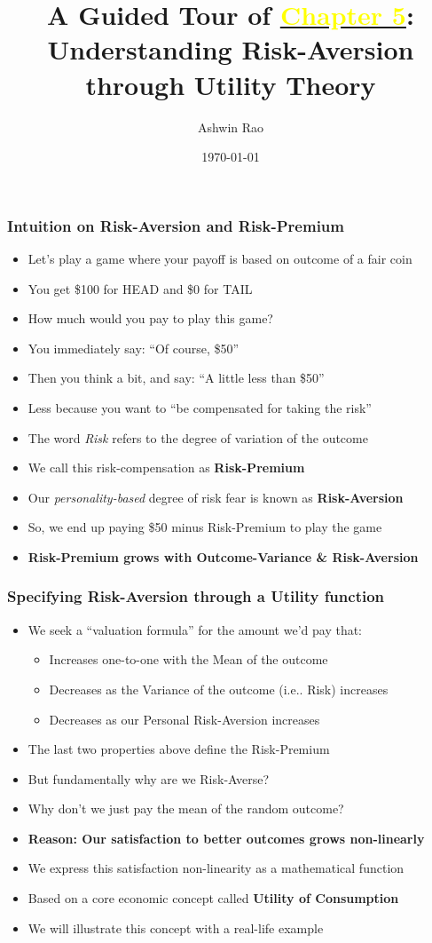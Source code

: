\documentclass[handout]{beamer}
\title[Utility Theory Chapter]{A Guided Tour of \href{http://stanford.edu/~ashlearn/RLForFinanceBook/book.pdf}{\underline{\textcolor{yellow}{Chapter 5}}}: \\  Understanding Risk-Aversion through Utility Theory}
\author{Ashwin Rao} %
\institute[Stanford] %
{
ICME, Stanford University
}
\date{\today} %
\begin{document}
\begin{frame}
\titlepage %
\end{frame}

\begin{frame}
\frametitle{Intuition on Risk-Aversion and Risk-Premium}
\pause
\begin{itemize}[<+->]
\item Let's play a game where your payoff is based on outcome of a fair coin
\item You get \$100 for HEAD and \$0 for TAIL
\item How much would you pay to play this game?
\item You immediately say: ``Of course, \$50''
\item Then you think a bit, and say: ``A little less than \$50''
\item Less because you want to ``be compensated for taking the risk''
\item The word {\em Risk} refers to the degree of variation of the outcome
\item We call this risk-compensation as {\bf Risk-Premium}
\item Our {\em personality-based} degree of risk fear is known as {\bf Risk-Aversion}
\item So, we end up paying \$50 minus Risk-Premium to play the game
\item {\bf Risk-Premium grows with Outcome-Variance \& Risk-Aversion}
\end{itemize}
\end{frame}

\begin{frame}
\frametitle{Specifying Risk-Aversion through a Utility function}
\pause
\begin{itemize}[<+->]
\item We seek a ``valuation formula'' for the amount we'd pay that:
\begin{itemize}
\item Increases one-to-one with the Mean of the outcome
\item Decreases as the Variance of the outcome (i.e.. Risk) increases
\item Decreases as our Personal Risk-Aversion increases
\end{itemize}
\item The last two properties above define the Risk-Premium
\item But fundamentally why are we Risk-Averse?
\item Why don't we just pay the mean of the random outcome?
\item {\bf Reason: Our satisfaction to better outcomes grows non-linearly}
\item We express this satisfaction non-linearity as a mathematical function
\item Based on a core economic concept called {\bf Utility of Consumption}
\item We will illustrate this concept with a real-life example
\end{itemize}
\end{frame}
\end{document}
